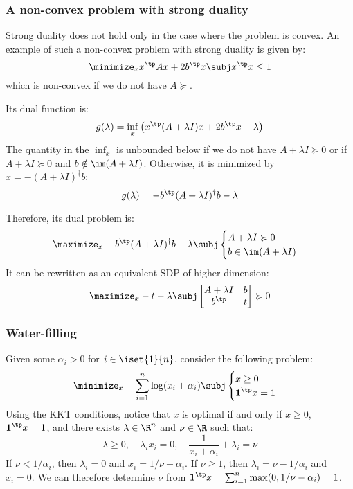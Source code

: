 \subsubsection{A non-convex problem with strong duality}
Strong duality does not hold only in the case where the problem is convex. An example of such a non-convex problem with strong duality is given by:
\begin{equation*}
    \minimize_x x^\tp Ax + 2b^\tp x \subj x^\tp x\leq1
\end{equation*}
which is non-convex if we do not have $A\succcurlyeq$.

Its dual function is:
\begin{equation*}
    g(\lambda) = \inf_x \left(x^\tp(A+\lambda I)x+2b^\tp x-\lambda\right)
\end{equation*}
The quantity in the $\inf_x$ is unbounded below if we do not have $A+\lambda I\succcurlyeq0$ or if $A+\lambda I\succcurlyeq0$ and $b\notin\im(A+\lambda I)$. Otherwise, it is minimized by $x=-(A+\lambda I)^\dagger b$:
\begin{equation*}
    g(\lambda)=-b^\tp(A+\lambda I)^\dagger b-\lambda
\end{equation*}

Therefore, its dual problem is:
\begin{equation*}
    \maximize_x -b^\tp(A+\lambda I)^\dagger b-\lambda \subj \begin{cases}
        A+\lambda I\succcurlyeq0\\
        b\in\im(A+\lambda I)
    \end{cases}
\end{equation*}
It can be rewritten as an equivalent SDP of higher dimension:
\begin{equation*}
    \maximize_x -t-\lambda \subj \begin{bmatrix}
        A+\lambda I & b\\
        b^\tp & t
    \end{bmatrix}\succcurlyeq0
\end{equation*}

\subsubsection{Water-filling}
Given some $\alpha_i>0$ for $i\in\iset{1}{n}$, consider the following problem:
\begin{equation*}
    \minimize_x -\sum_{i=1}^n \log(x_i+\alpha_i) \subj \begin{cases}
        x\geq0\\
        \textbf{1}^\tp x=1
    \end{cases}
\end{equation*}
Using the KKT conditions, notice that $x$ is optimal if and only if $x\geq0$, $\textbf{1}^\tp x=1$, and there exists $\lambda\in\R^n$ and $\nu\in\R$ such that:
\begin{equation*}
    \lambda\geq0,\quad\lambda_ix_i=0,\quad \frac{1}{x_i+\alpha_i}+\lambda_i=\nu
\end{equation*}
If $\nu<1/\alpha_i$, then $\lambda_i=0$ and $x_i=1/\nu-\alpha_i$. If $\nu\geq1$, then $\lambda_i=\nu-1/\alpha_i$ and $x_i=0$. We can therefore determine $\nu$ from $\textbf{1}^\tp x=\sum_{i=1}^n\max(0, 1/\nu-\alpha_i)=1$.

